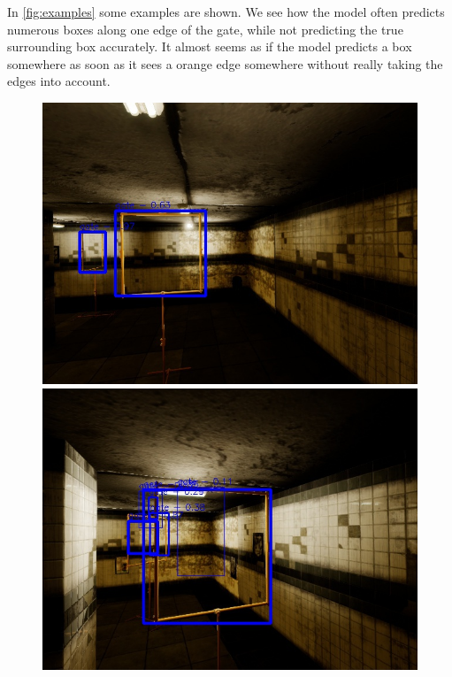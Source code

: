 \documentclass{article}
\begin{document}
In \autoref{fig:examples} some examples are shown. We see how the model often predicts numerous boxes along one edge of the gate, while not predicting the true surrounding box accurately. It almost seems as if the model predicts a box somewhere as soon as it sees a orange edge somewhere without really taking the edges into account.

\begin{figure}
	\centering
	\begin{minipage}{0.3\textwidth}
		\includegraphics[width=\textwidth]{fig/v2}
	\end{minipage}
	\begin{minipage}{0.3\textwidth}
		\includegraphics[width=\textwidth]{fig/v22}
	\end{minipage}

\end{figure}
\end{document}

